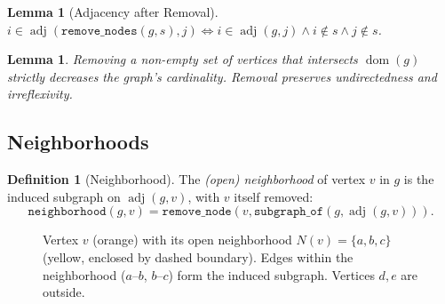 \documentclass[11pt]{article}
\theoremstyle{plain}
\newtheorem{lemma}[theorem]{Lemma}
\theoremstyle{definition}
\newtheorem{definition}[theorem]{Definition}
\theoremstyle{remark}
\newcommand{\adj}{\operatorname{adj}}
\begin{document}
\begin{lemma}[Adjacency after Removal]
\label{lem:adj-remove}
$i \in \adj(\texttt{remove\_nodes}(g,s), j) \iff i \in \adj(g,j) \wedge i \notin s \wedge j \notin s$.
\end{lemma}

\begin{lemma}
Removing a non-empty set of vertices that intersects $\operatorname{dom}(g)$ strictly decreases the graph's cardinality. Removal preserves undirectedness and irreflexivity.
\end{lemma}

\subsection{Neighborhoods}

\begin{definition}[Neighborhood]
The \emph{(open) neighborhood} of vertex $v$ in $g$ is the induced subgraph on $\adj(g,v)$, with $v$ itself removed:
\[
  \texttt{neighborhood}(g, v) = \texttt{remove\_node}(v, \texttt{subgraph\_of}(g, \adj(g,v))).
\]
\end{definition}

\begin{figure}[ht]
\centering
{}
\caption{Vertex $v$ (orange) with its open neighborhood $N(v) = \{a, b, c\}$ (yellow, enclosed by dashed boundary). Edges within the neighborhood ($a$--$b$, $b$--$c$) form the induced subgraph. Vertices $d, e$ are outside.}
\label{fig:neighborhood}
\end{figure}
\end{document}
